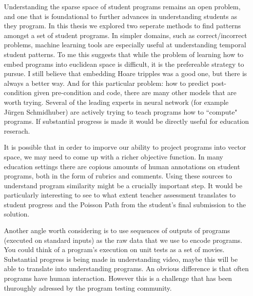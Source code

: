 Understanding the sparse space of student programs remains an open problem, and one that is foundational to further advances in understanding students as they program. In this thesis we explored two seperate methods to find patterns amongst a set of student programs. In simpler domains, such as correct/incorrect problems, machine learning tools are especially useful at understanding temporal student patterns. To me this suggests that while the problem of learning how to embed programs into euclidean space is difficult, it is the prefereable strategy to pursue. I still believe that embedding Hoare tripples was a good one, but there is always a better way. And for this particular problem: how to predict post-condition given pre-condition and code, there are many other models that are worth trying. Several of the leading experts in neural network (for example Jürgen Schmidhuber) are actively trying to teach programs how to ``compute" programs. If substantial progress is made it would be directly useful for education reserach.

It is possible that in order to imporve our ability to project programs into vector space, we may need to come up with a richer objective function. In many education settings there are copious amounts of human annotations on student programs, both in the form of rubrics and comments. Using these sources to understand program similarity might be a crucially important step. It would be particularly interesting to see to what extent teacher assessment translates to student progress and the Poisson Path from the student's final submission to the solution.

Another angle worth considering is to use sequences of outputs of programs (executed on standard inputs) as the raw data that we use to encode programs. You could think of a program's execution on unit tests as a set of movies. Substantial progress is being made in understanding video, maybe this will be able to translate into understanding programs. An obvious difference is that often programs have human interaction. However this is a challenge that has been thuroughly adressed by the program testing community.



